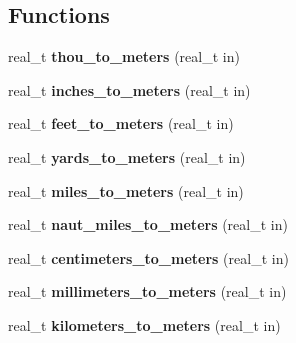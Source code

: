 \subsection*{Functions}
\begin{DoxyCompactItemize}
\item 
\hypertarget{namespaceetk_aa6ae80824f49d6eeb0844c75a39f584e}{real\-\_\-t {\bfseries thou\-\_\-to\-\_\-meters} (real\-\_\-t in)}\label{namespaceetk_aa6ae80824f49d6eeb0844c75a39f584e}

\item 
\hypertarget{namespaceetk_a0c7a1335f96a9454e0607ffc76f24c5d}{real\-\_\-t {\bfseries inches\-\_\-to\-\_\-meters} (real\-\_\-t in)}\label{namespaceetk_a0c7a1335f96a9454e0607ffc76f24c5d}

\item 
\hypertarget{namespaceetk_ad7353d22d4703de87f6f328f10efb6c8}{real\-\_\-t {\bfseries feet\-\_\-to\-\_\-meters} (real\-\_\-t in)}\label{namespaceetk_ad7353d22d4703de87f6f328f10efb6c8}

\item 
\hypertarget{namespaceetk_aaef13ec5daa78a2db8f8171d5ae1866c}{real\-\_\-t {\bfseries yards\-\_\-to\-\_\-meters} (real\-\_\-t in)}\label{namespaceetk_aaef13ec5daa78a2db8f8171d5ae1866c}

\item 
\hypertarget{namespaceetk_ad482b6f7d12c8c91fe8c57a97dd056f4}{real\-\_\-t {\bfseries miles\-\_\-to\-\_\-meters} (real\-\_\-t in)}\label{namespaceetk_ad482b6f7d12c8c91fe8c57a97dd056f4}

\item 
\hypertarget{namespaceetk_adb0ed9407403f8d9344d2ae364a53891}{real\-\_\-t {\bfseries naut\-\_\-miles\-\_\-to\-\_\-meters} (real\-\_\-t in)}\label{namespaceetk_adb0ed9407403f8d9344d2ae364a53891}

\item 
\hypertarget{namespaceetk_ab51481f880444ad2c1cd58a2472eaa17}{real\-\_\-t {\bfseries centimeters\-\_\-to\-\_\-meters} (real\-\_\-t in)}\label{namespaceetk_ab51481f880444ad2c1cd58a2472eaa17}

\item 
\hypertarget{namespaceetk_a19b0ae5f16f57a91ed9db639a02dd4d7}{real\-\_\-t {\bfseries millimeters\-\_\-to\-\_\-meters} (real\-\_\-t in)}\label{namespaceetk_a19b0ae5f16f57a91ed9db639a02dd4d7}

\item 
\hypertarget{namespaceetk_a46426be3bca42f084ae7e2d5ac81aceb}{real\-\_\-t {\bfseries kilometers\-\_\-to\-\_\-meters} (real\-\_\-t in)}\label{namespaceetk_a46426be3bca42f084ae7e2d5ac81aceb}


\end{DoxyCompactItemize}
